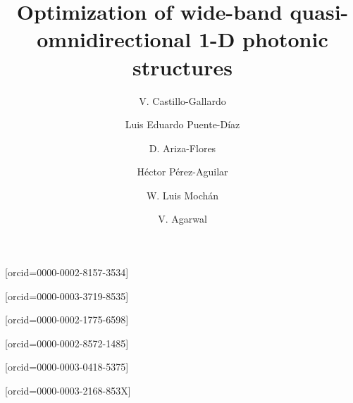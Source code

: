 \documentclass[a4paper,fleqn]{cas-sc}
\begin{document}
\let\WriteBookmarks\relax
\def\floatpagepagefraction{1}
\def\textpagefraction{.001}

\title [mode = title]{Optimization of wide-band quasi-omnidirectional 1-D photonic structures}

\author[1,2,3]{V. Castillo-Gallardo}[orcid=0000-0002-8157-3534]
\cormark[1]
\address[1]{Centro de Investigaci\'{o}n en Ingenier\'{i}a y
  Ciencias Aplicadas, Universidad del Estado de Morelos, Av.
  Universidad 1001, Col. Chamilpa, Cuernavaca, Morelos 62209,
  M\'{e}xico.}

\author[1,2,3]{Luis Eduardo Puente-D\'{i}az}[orcid=0000-0003-3719-8535]
\address[2]{Instituto de Ciencias F\'{i}sicas, Universidad
  Nacional Aut\'{o}noma de M\'{e}xico, Av. Universidad S/N,
  Col. Chamilpa, 62210 Cuernavaca, Morelos, M\'{e}xico.}
\address[3]{Facultad de Ciencias F\'{i}sico Matem\'{a}ticas,
  Universidad Michoacana de San Nicol\'{a}s de Hidalgo, Av.
  Francisco J. M\'ugica S/N 58030, Morelia, Mich., M\'{e}xico.}

\author[4]{D. Ariza-Flores}[orcid=0000-0002-1775-6598]
\address[4]{CONACyT-Universidad Aut\'{o}noma de San Luis
  Potos\'{i}, Karakorum 1470, Lomas 4ta Secc, San Luis Potos\'{i},
  S.L.P., 78210, M\'{e}xico.}

\author[3]{H\'{e}ctor P\'{e}rez-Aguilar}[orcid=0000-0002-8572-1485]

\author[2]{W. Luis Moch\'{a}n}[orcid=0000-0003-0418-5375]

\author[1]{V. Agarwal}[orcid=0000-0003-2168-853X]
\fnmark[1]

\end{document}
